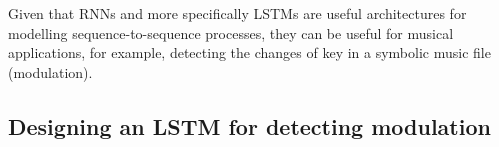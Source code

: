 Given that RNNs and more specifically LSTMs are useful architectures for modelling sequence-to-sequence processes, they can be useful for musical applications, for example, detecting the changes of key in a symbolic music file (modulation).












\subsection{Designing an LSTM for detecting modulation}

